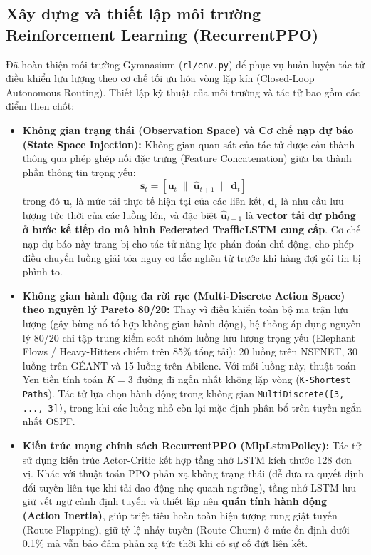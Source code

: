 \documentclass[11pt,a4paper]{article}
\begin{document}
\subsection{Xây dựng và thiết lập môi trường Reinforcement Learning (RecurrentPPO)}
Đã hoàn thiện môi trường Gymnasium (\texttt{rl/env.py}) để phục vụ huấn luyện tác tử điều khiển lưu lượng theo cơ chế tối ưu hóa vòng lặp kín (Closed-Loop Autonomous Routing). Thiết lập kỹ thuật của môi trường và tác tử bao gồm các điểm then chốt:

\begin{itemize}[leftmargin=1.5em, itemsep=0.3ex]
    \item \textbf{Không gian trạng thái (Observation Space) và Cơ chế nạp dự báo (State Space Injection):} Không gian quan sát của tác tử được cấu thành thông qua phép ghép nối đặc trưng (Feature Concatenation) giữa ba thành phần thông tin trọng yếu:
    \begin{equation}
        \mathbf{s}_t = \left[ \mathbf{u}_t \;\parallel\; \mathbf{\hat{u}}_{t+1} \;\parallel\; \mathbf{d}_t \right]
    \end{equation}
    trong đó $\mathbf{u}_t$ là mức tải thực tế hiện tại của các liên kết, $\mathbf{d}_t$ là nhu cầu lưu lượng tức thời của các luồng lớn, và đặc biệt $\mathbf{\hat{u}}_{t+1}$ là \textbf{vector tải dự phóng ở bước kế tiếp do mô hình Federated TrafficLSTM cung cấp}. Cơ chế nạp dự báo này trang bị cho tác tử năng lực phán đoán chủ động, cho phép điều chuyển luồng giải tỏa nguy cơ tắc nghẽn từ trước khi hàng đợi gói tin bị phình to.
    
    \item \textbf{Không gian hành động đa rời rạc (Multi-Discrete Action Space) theo nguyên lý Pareto 80/20:} Thay vì điều khiển toàn bộ ma trận lưu lượng (gây bùng nổ tổ hợp không gian hành động), hệ thống áp dụng nguyên lý 80/20 chỉ tập trung kiểm soát nhóm luồng lưu lượng trọng yếu (Elephant Flows / Heavy-Hitters chiếm trên 85\% tổng tải): 20 luồng trên NSFNET, 30 luồng trên GÉANT và 15 luồng trên Abilene. Với mỗi luồng này, thuật toán Yen tiền tính toán $K = 3$ đường đi ngắn nhất không lặp vòng (\texttt{K-Shortest Paths}). Tác tử lựa chọn hành động trong không gian \texttt{MultiDiscrete([3, ..., 3])}, trong khi các luồng nhỏ còn lại mặc định phân bổ trên tuyến ngắn nhất OSPF.

    \item \textbf{Kiến trúc mạng chính sách RecurrentPPO (MlpLstmPolicy):} Tác tử sử dụng kiến trúc Actor-Critic kết hợp tầng nhớ LSTM kích thước 128 đơn vị. Khác với thuật toán PPO phản xạ không trạng thái (dễ đưa ra quyết định đổi tuyến liên tục khi tải dao động nhẹ quanh ngưỡng), tầng nhớ LSTM lưu giữ vết ngữ cảnh định tuyến và thiết lập nên \textbf{quán tính hành động (Action Inertia)}, giúp triệt tiêu hoàn toàn hiện tượng rung giật tuyến (Route Flapping), giữ tỷ lệ nhảy tuyến (Route Churn) ở mức ổn định dưới 0.1\% mà vẫn bảo đảm phản xạ tức thời khi có sự cố đứt liên kết.
\end{itemize}
\end{document}
